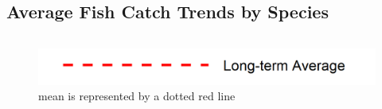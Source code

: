 \documentclass[
]{book}
\begin{document}
\hypertarget{average-fish-catch-trends-by-species}{%
\subsection{Average Fish Catch Trends by Species}\label{average-fish-catch-trends-by-species}}

\begin{columns-nocenter}

\begin{column}

\begin{figure}
\includegraphics[width=15.25in]{figures/mline} \caption{mean is represented by a dotted red line}\label{fig:unnamed-chunk-169}
\end{figure}

\end{column}

\begin{column}

\end{column}

\begin{column}

\end{column}

\end{columns-nocenter}
\end{document}
